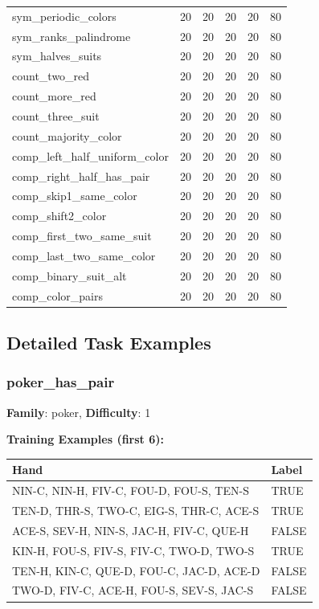 \documentclass[10pt,a4paper]{article}
\begin{document}
\begin{tabular}{lrrrrr}
sym\_periodic\_colors & 20 & 20 & 20 & 20 & 80 \\
sym\_ranks\_palindrome & 20 & 20 & 20 & 20 & 80 \\
sym\_halves\_suits & 20 & 20 & 20 & 20 & 80 \\
count\_two\_red & 20 & 20 & 20 & 20 & 80 \\
count\_more\_red & 20 & 20 & 20 & 20 & 80 \\
count\_three\_suit & 20 & 20 & 20 & 20 & 80 \\
count\_majority\_color & 20 & 20 & 20 & 20 & 80 \\
comp\_left\_half\_uniform\_color & 20 & 20 & 20 & 20 & 80 \\
comp\_right\_half\_has\_pair & 20 & 20 & 20 & 20 & 80 \\
comp\_skip1\_same\_color & 20 & 20 & 20 & 20 & 80 \\
comp\_shift2\_color & 20 & 20 & 20 & 20 & 80 \\
comp\_first\_two\_same\_suit & 20 & 20 & 20 & 20 & 80 \\
comp\_last\_two\_same\_color & 20 & 20 & 20 & 20 & 80 \\
comp\_binary\_suit\_alt & 20 & 20 & 20 & 20 & 80 \\
comp\_color\_pairs & 20 & 20 & 20 & 20 & 80 \\
\bottomrule
\end{tabular}

\subsection{Detailed Task Examples}

\subsubsection{poker\_has\_pair}

\textbf{Family}: poker, \textbf{Difficulty}: 1

\textbf{Training Examples (first 6):}

\begin{small}
\begin{tabular}{p{8cm}l}
\toprule
Hand & Label \\
\midrule
NIN-C, NIN-H, FIV-C, FOU-D, FOU-S, TEN-S & \textcolor{positive}{TRUE} \\
TEN-D, THR-S, TWO-C, EIG-S, THR-C, ACE-S & \textcolor{positive}{TRUE} \\
ACE-S, SEV-H, NIN-S, JAC-H, FIV-C, QUE-H & \textcolor{negative}{FALSE} \\
KIN-H, FOU-S, FIV-S, FIV-C, TWO-D, TWO-S & \textcolor{positive}{TRUE} \\
TEN-H, KIN-C, QUE-D, FOU-C, JAC-D, ACE-D & \textcolor{negative}{FALSE} \\
TWO-D, FIV-C, ACE-H, FOU-S, SEV-S, JAC-S & \textcolor{negative}{FALSE} \\
\bottomrule
\end{tabular}
\end{small}
\end{document}
